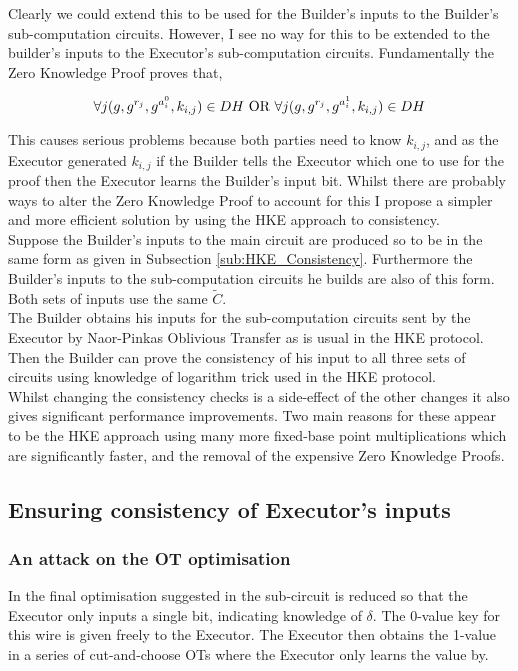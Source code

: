 \documentclass[ %
                    author={Nicholas Tutte},
                supervisor={Prof. Nigel Smart},
                    degree={MEng},
                     title={Secure Two Party Computation},
                  subtitle={A practical comparison of recent protocols},
                      type={Research - GG1K},
                      year={2015} ]{dissertation}
\begin{document}
				Clearly we could extend this to be used for the Builder's inputs to the Builder's sub-computation circuits. However, I see no way for this to be extended to the builder's inputs to the Executor's sub-computation circuits. Fundamentally the Zero Knowledge Proof proves that,
				
				$$\forall j (g, g^{r_j}, g^{a_i^0}, k_{i,j}) \in DH \textnormal{ OR } \forall j (g, g^{r_j}, g^{a_i^1}, k_{i,j}) \in DH$$
				
				This causes serious problems because both parties need to know $k_{i,j}$, and as the Executor generated $k_{i,j}$ if the Builder tells the Executor which one to use for the proof then the Executor learns the Builder's input bit. Whilst there are probably ways to alter the Zero Knowledge Proof to account for this I propose a simpler and more efficient solution by using the HKE approach to consistency.\\

				Suppose the Builder's inputs to the main circuit are produced so to be in the same form as given in Subsection \ref{sub:HKE_Consistency}. Furthermore the Builder's inputs to the sub-computation circuits he builds are also of this form. Both sets of inputs use the same $\tilde C$.\\

				The Builder obtains his inputs for the sub-computation circuits sent by the Executor by Naor-Pinkas Oblivious Transfer as is usual in the HKE protocol. Then the Builder can prove the consistency of his input to all three sets of circuits using knowledge of logarithm trick used in the HKE protocol.\\

				Whilst changing the consistency checks is a side-effect of the other changes it also gives significant performance improvements. Two main reasons for these appear to be the HKE approach using many more fixed-base point multiplications which are significantly faster, and the removal of the expensive Zero Knowledge Proofs.\\

			\subsection{Ensuring consistency of Executor's inputs}
				\subsubsection{An attack on the OT optimisation}
					In the final optimisation suggested in \cite{Lindell_CnC_2013} the sub-circuit is reduced so that the Executor only inputs a single bit, indicating knowledge of $\delta$. The 0-value key for this wire is given freely to the Executor. The Executor then obtains the 1-value in a series of cut-and-choose OTs where the Executor only learns the value by.\\
\end{document}
